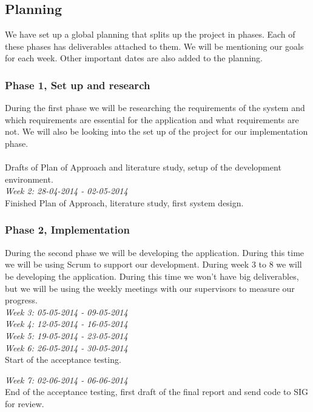 \documentclass[]{article}
\begin{document}
\subsection{Planning}
We have set up a global planning that splits up the project in phases.
Each of these phases has deliverables attached to them.
We will be mentioning our goals for each week.
Other important dates are also added to the planning.

\subsubsection{Phase 1, Set up and research}
During the first phase we will be researching the requirements of the system and which requirements are essential for the application and what requirements are not.
We will also be looking into the set up of the project for our implementation phase.\\

\\
Drafts of Plan of Approach and literature study, setup of the development environment.\\
\noindent\emph{Week 2: 28-04-2014 - 02-05-2014}\\
Finished Plan of Approach, literature study, first system design.

\subsubsection{Phase 2, Implementation}
During the second phase we will be developing the application.
During this time we will be using Scrum to support our development.
During week 3 to 8 we will be developing the application.
During this time we won't have big deliverables, but we will be using the weekly meetings with our supervisors to measure our progress.\\

\noindent\emph{Week 3: 05-05-2014 - 09-05-2014}\\

\noindent\emph{Week 4: 12-05-2014 - 16-05-2014}\\

\noindent\emph{Week 5: 19-05-2014 - 23-05-2014}\\

\noindent\emph{Week 6: 26-05-2014 - 30-05-2014}\\
Start of the acceptance testing.

\noindent\emph{Week 7: 02-06-2014 - 06-06-2014}\\
End of the acceptance testing, first draft of the final report and send code to SIG for review.
\end{document}
